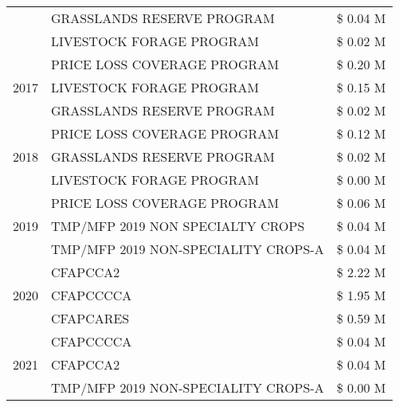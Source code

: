 \begin{tabular}{llr}
 & GRASSLANDS RESERVE PROGRAM & \$ 0.04 M \\
 & LIVESTOCK FORAGE PROGRAM & \$ 0.02 M \\
\cline{1-3}
\multirow[t]{3}{*}{2017} & PRICE LOSS COVERAGE PROGRAM & \$ 0.20 M \\
 & LIVESTOCK FORAGE PROGRAM & \$ 0.15 M \\
 & GRASSLANDS RESERVE PROGRAM & \$ 0.02 M \\
\cline{1-3}
\multirow[t]{3}{*}{2018} & PRICE LOSS COVERAGE PROGRAM & \$ 0.12 M \\
 & GRASSLANDS RESERVE PROGRAM & \$ 0.02 M \\
 & LIVESTOCK FORAGE PROGRAM & \$ 0.00 M \\
\cline{1-3}
\multirow[t]{3}{*}{2019} & PRICE LOSS COVERAGE PROGRAM & \$ 0.06 M \\
 & TMP/MFP 2019 NON SPECIALTY CROPS & \$ 0.04 M \\
 & TMP/MFP 2019 NON-SPECIALITY CROPS-A & \$ 0.04 M \\
\cline{1-3}
\multirow[t]{3}{*}{2020} & CFAPCCA2 & \$ 2.22 M \\
 & CFAPCCCCA & \$ 1.95 M \\
 & CFAPCARES & \$ 0.59 M \\
\cline{1-3}
\multirow[t]{3}{*}{2021} & CFAPCCCCA & \$ 0.04 M \\
 & CFAPCCA2 & \$ 0.04 M \\
 & TMP/MFP 2019 NON-SPECIALITY CROPS-A & \$ 0.00 M \\
\cline{1-3}
\bottomrule
\end{tabular}
